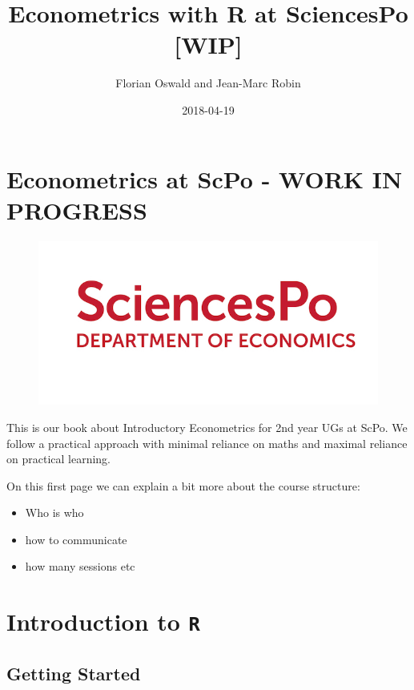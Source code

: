 \documentclass[]{book}
\title{Econometrics with R at SciencesPo {[}WIP{]}}
\author{Florian Oswald and Jean-Marc Robin}
\date{2018-04-19}
\providecommand{\tightlist}{%
  \setlength{\itemsep}{0pt}\setlength{\parskip}{0pt}}
\theoremstyle{definition}
\theoremstyle{definition}
\theoremstyle{definition}
\theoremstyle{remark}
\begin{document}
\maketitle

{
\setcounter{tocdepth}{1}
\tableofcontents
}
\chapter{Econometrics at ScPo - WORK IN
PROGRESS}\label{econometrics-at-scpo---work-in-progress}

\begin{figure}
\centering
\includegraphics{ScPo.jpg}
\caption{}
\end{figure}

This is our book about Introductory Econometrics for 2nd year UGs at
ScPo. We follow a practical approach with minimal reliance on maths and
maximal reliance on practical learning.

On this first page we can explain a bit more about the course structure:

\begin{itemize}
\tightlist
\item
  Who is who
\item
  how to communicate
\item
  how many sessions etc
\end{itemize}

\chapter{\texorpdfstring{Introduction to
\texttt{R}}{Introduction to R}}\label{R-intro}

\section{Getting Started}\label{getting-started}
\end{document}
